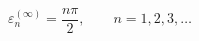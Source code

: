 \begin{equation}
\varepsilon _{n}^{\left( \infty \right) }=\frac{n\pi }{2},\qquad
n=1,2,3,\ldots  \label{eq110}
\end{equation}

